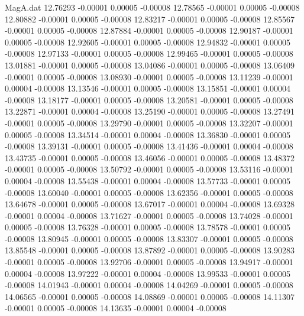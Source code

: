 \begin{filecontents}{MagA.dat}
  12.76293   -0.00001    0.00005   -0.00008
  12.78565   -0.00001    0.00005   -0.00008
  12.80882   -0.00001    0.00005   -0.00008
  12.83217   -0.00001    0.00005   -0.00008
  12.85567   -0.00001    0.00005   -0.00008
  12.87884   -0.00001    0.00005   -0.00008
  12.90187   -0.00001    0.00005   -0.00008
  12.92605   -0.00001    0.00005   -0.00008
  12.94832   -0.00001    0.00005   -0.00008
  12.97133   -0.00001    0.00005   -0.00008
  12.99465   -0.00001    0.00005   -0.00008
  13.01881   -0.00001    0.00005   -0.00008
  13.04086   -0.00001    0.00005   -0.00008
  13.06409   -0.00001    0.00005   -0.00008
  13.08930   -0.00001    0.00005   -0.00008
  13.11239   -0.00001    0.00004   -0.00008
  13.13546   -0.00001    0.00005   -0.00008
  13.15851   -0.00001    0.00004   -0.00008
  13.18177   -0.00001    0.00005   -0.00008
  13.20581   -0.00001    0.00005   -0.00008
  13.22871   -0.00001    0.00004   -0.00008
  13.25190   -0.00001    0.00005   -0.00008
  13.27491   -0.00001    0.00005   -0.00008
  13.29790   -0.00001    0.00005   -0.00008
  13.32207   -0.00001    0.00005   -0.00008
  13.34514   -0.00001    0.00004   -0.00008
  13.36830   -0.00001    0.00005   -0.00008
  13.39131   -0.00001    0.00005   -0.00008
  13.41436   -0.00001    0.00004   -0.00008
  13.43735   -0.00001    0.00005   -0.00008
  13.46056   -0.00001    0.00005   -0.00008
  13.48372   -0.00001    0.00005   -0.00008
  13.50792   -0.00001    0.00005   -0.00008
  13.53116   -0.00001    0.00004   -0.00008
  13.55438   -0.00001    0.00004   -0.00008
  13.57733   -0.00001    0.00005   -0.00008
  13.60040   -0.00001    0.00005   -0.00008
  13.62356   -0.00001    0.00005   -0.00008
  13.64678   -0.00001    0.00005   -0.00008
  13.67017   -0.00001    0.00004   -0.00008
  13.69328   -0.00001    0.00004   -0.00008
  13.71627   -0.00001    0.00005   -0.00008
  13.74028   -0.00001    0.00005   -0.00008
  13.76328   -0.00001    0.00005   -0.00008
  13.78578   -0.00001    0.00005   -0.00008
  13.80945   -0.00001    0.00005   -0.00008
  13.83307   -0.00001    0.00005   -0.00008
  13.85548   -0.00001    0.00005   -0.00008
  13.87892   -0.00001    0.00005   -0.00008
  13.90283   -0.00001    0.00005   -0.00008
  13.92706   -0.00001    0.00005   -0.00008
  13.94917   -0.00001    0.00004   -0.00008
  13.97222   -0.00001    0.00004   -0.00008
  13.99533   -0.00001    0.00005   -0.00008
  14.01943   -0.00001    0.00004   -0.00008
  14.04269   -0.00001    0.00005   -0.00008
  14.06565   -0.00001    0.00005   -0.00008
  14.08869   -0.00001    0.00005   -0.00008
  14.11307   -0.00001    0.00005   -0.00008
  14.13635   -0.00001    0.00004   -0.00008

\end{filecontents}
